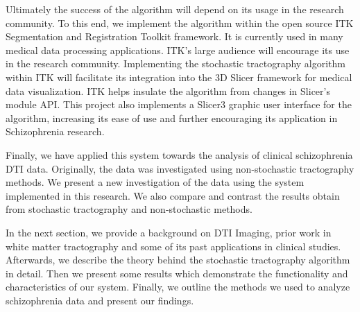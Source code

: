Ultimately the success of the algorithm will depend on its usage in the research community.  To this end, we implement the algorithm within the open source ITK Segmentation and Registration Toolkit \cite{itk} framework.  It is currently used in many medical data processing applications.  ITK's large audience will encourage its use in the research community.  Implementing the stochastic tractography algorithm within ITK will facilitate its integration into the 3D Slicer framework \cite{3Dslicer} for medical data visualization.  ITK helps insulate the algorithm from changes in Slicer's module API.  This project also implements a Slicer3 graphic user interface for the algorithm, increasing its ease of use and further encouraging its application in Schizophrenia research.

Finally, we have applied this system towards the analysis of clinical schizophrenia DTI data.  Originally, the data was investigated using non-stochastic tractography methods.  We present a new investigation of the data using the system implemented in this research.  We also compare and contrast the results obtain from stochastic tractography and non-stochastic methods.

In the next section, we provide a background on DTI Imaging, prior work in white matter tractography and some of its past applications in clinical studies.  Afterwards, we describe the theory behind the stochastic tractography algorithm in detail.  Then we present some results which demonstrate the functionality and characteristics of our system.  Finally, we outline the methods we used to analyze schizophrenia data and present our findings.


